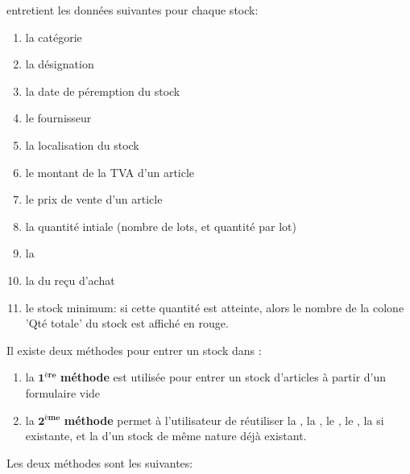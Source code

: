 


\yeren entretient les donn\'ees suivantes pour chaque stock:
\begin{enumerate}[1)]
	\item la cat\'egorie \obligatoire
	\item la d\'esignation \obligatoire
	\item la date de p\'eremption du stock 
	\item le fournisseur 
	\item la localisation du stock
	\item le montant de la TVA d'un article 
	\item le prix de vente d'un article \obligatoire
	\item la quantit\'e intiale (nombre de lots, et quantit\'e par lot) \obligatoire
	\item la 
	\item la  du re\c{c}u d'achat
	\item le stock minimum: si cette quantit\'e
		est atteinte, alors le nombre de la colone 'Qt\'e totale'
		du stock est affich\'e en rouge.\\
\end{enumerate}

Il existe deux m\'ethodes pour entrer un stock dans \yeren:
\begin{enumerate}[1)]
	\item la $\mathbf{1^{\textbf{\`ere}}}$ \textbf{m\'ethode}
	est utilis\'ee pour entrer un stock d'articles \`a partir
	d'un formulaire vide
	
	\item la $\mathbf{2^{\textbf{\`eme}}}$ \textbf{m\'ethode}
	permet \`a l'utilisateur de r\'eutiliser la
	, la ,
	le , le ,
	la  si existante, et la 
	d'un stock de m\^eme nature d\'ej\`a existant.\\
\end{enumerate}

Les deux m\'ethodes sont les suivantes:

